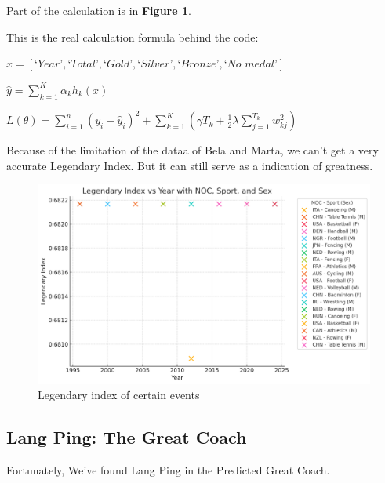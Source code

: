 Part of the calculation is in \textbf{Figure \ref{fig:legendary_index_detailed}}.

This is the real calculation formula behind the code:
\begin{center}
$ x = [\textit{`Year'}, \textit{`Total'}, \textit{`Gold'}, \textit{`Silver'}, \textit{`Bronze'}, \textit{`No medal'}]$

$\hat{y} = \sum_{k=1}^{K} \alpha_k h_k(x)$

$L(\theta) = \sum_{i=1}^{n} \left( y_i - \hat{y}_i \right)^2 + \sum_{k=1}^{K} \left( \gamma T_k + \frac{1}{2} \lambda \sum_{j=1}^{T_k} w_{kj}^2 \right)$

\end{center}

Because of the limitation of the dataa of Bela and Marta, we can't get a very accurate Legendary Index. But it can still serve as a indication of greatness.

\begin{figure}[h]
\centering
    \includegraphics[width=1\textwidth]{./figures/Lengendary_index_detailed.png}
    \caption{Legendary index of certain events}
    \label{fig:legendary_index_detailed}
\end{figure}

\subsection{Lang Ping: The Great Coach}

Fortunately, We've found Lang Ping in the Predicted Great Coach.

